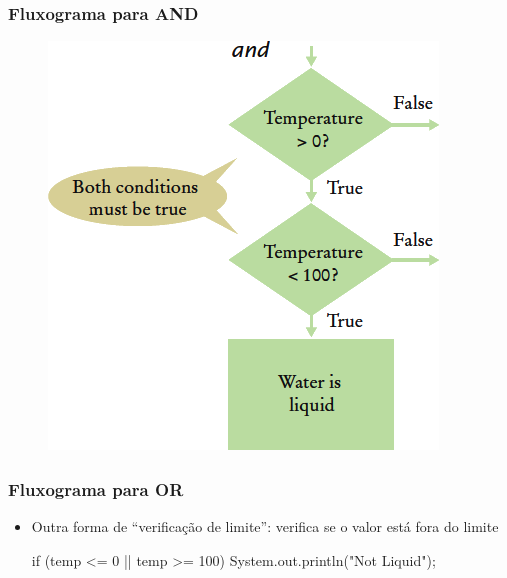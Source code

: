 \documentclass[xcolor={dvipsnames,table},aspectratio=169]{beamer}
\begin{document}
\begin{frame}[fragile]\frametitle{Fluxograma para AND}
\begin{figure}[h]
	\includegraphics[height=0.70\paperheight,center]{pucrs-ep-fprog-unidade_03-decisoes-laminas-fluxograma_and.png}
\end{figure}
\end{frame}

\begin{frame}[fragile]\frametitle{Fluxograma para OR}
\begin{itemize}
	\item Outra forma de ``verificação de limite'': verifica se o valor está fora do limite
\begin{javacode}
if (temp <= 0 || temp >= 100) {
  System.out.println("Not Liquid"); 
}
\end{javacode}
\end{itemize}
\end{frame}
\end{document}
